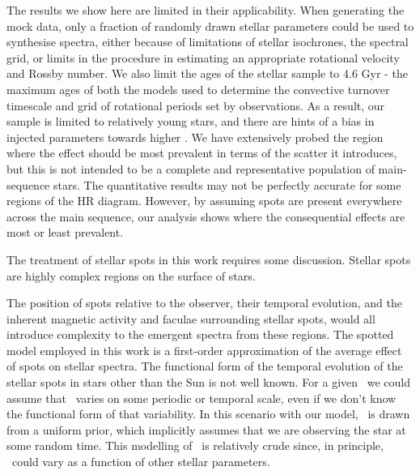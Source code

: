 The results we show here are limited in their applicability. When generating the mock data, only a fraction of randomly drawn stellar parameters could be used to synthesise spectra, either because of limitations of stellar isochrones, the spectral grid, or limits in the procedure in estimating an appropriate rotational velocity and Rossby number. We also limit the ages of the stellar sample to 4.6 Gyr - the maximum ages of both the models used to determine the convective turnover timescale and grid of rotational periods set by observations. As a result, our sample is limited to relatively young stars, and there are hints of a bias in injected parameters towards higher \fspot. We have extensively probed the region where the effect should be most prevalent in terms of the scatter it introduces, but this is not intended to be a complete and representative population of main-sequence stars. The quantitative results may not be perfectly accurate for some regions of the HR diagram. However, by assuming spots are present everywhere across the main sequence, our analysis shows where the consequential effects are most or least prevalent. 

The treatment of stellar spots in this work requires some discussion. Stellar spots are highly complex regions on the surface of stars. 
 
The position of spots relative to the observer, their temporal evolution, and the inherent magnetic activity and faculae surrounding stellar spots, would all introduce complexity to the emergent spectra from these regions. The spotted model employed in this work is a first-order approximation of the average effect of spots on stellar spectra. 
The functional form of the temporal evolution of the stellar spots in stars other than the Sun is not well known. For a given \fspot\, we could assume that \xspot\ varies on some periodic or temporal scale, even if we don't know the functional form of that variability. In this scenario with our model, \xspot\ is drawn from a uniform prior, which implicitly assumes that we are observing the star at some random time. This modelling of \xspot\ is relatively crude since, in principle, \xspot\ could vary as a function of other stellar parameters.


